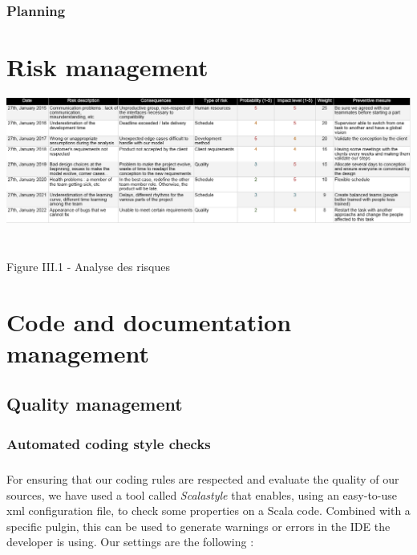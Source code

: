 \documentclass{report}
\begin{document}
\subsection{Planning}


\chapter{Risk management}

\begin{center}
\includegraphics[scale=0.5]{data/risks.png}
~\\~\\Figure III.1 - Analyse des risques
\end{center}

\chapter{Code and documentation management}

\section{Quality management}

\subsection{Automated coding style checks}

\paragraph{}
\hspace{4mm}\textnormal{For ensuring that our coding rules are respected and evaluate the quality of our sources, we have
used a tool called \textit{Scalastyle} that enables, using an easy-to-use xml configuration file, to check
some properties on a Scala code. Combined with a specific pulgin, this can be used to generate warnings or errors
in the IDE the developer is using. Our settings are the following :}
\end{document}
